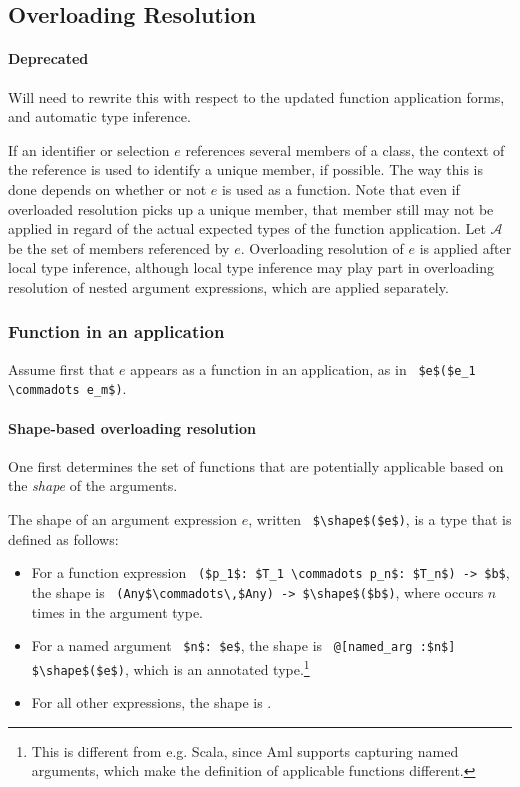\subsection{Overloading Resolution}
\label{sec:overloading-resolution}

\paragraph{Deprecated}
Will need to rewrite this with respect to the updated function application forms, and automatic type inference. 

If an identifier or selection $e$ references several members of a class, the context of the reference is used to identify a unique member, if possible. The way this is done depends on whether or not $e$ is used as a function. Note that even if overloaded resolution picks up a unique member, that member still may not be applied in regard of the actual expected types of the function application. Let $\mathcal{A}$ be the set of members referenced by $e$. Overloading resolution of $e$ is applied after local type inference, although local type inference may play part in overloading resolution of nested argument expressions, which are applied separately. 

\subsubsection{Function in an application}

Assume first that $e$ appears as a function in an application, as in ~\lstinline!$e$($e_1 \commadots e_m$)!.

\paragraph{Shape-based overloading resolution}
One first determines the set of functions that are potentially applicable based on the {\em shape} of the arguments. 

The shape of an argument expression $e$, written ~\lstinline!$\shape$($e$)!, is a type that is defined as follows:
\begin{itemize}
\item For a function expression ~\lstinline!($p_1$: $T_1 \commadots p_n$: $T_n$) -> $b$!, the shape is ~\lstinline!(Any$\commadots\,$Any) -> $\shape$($b$)!, where  occurs $n$ times in the argument type. 
\item For a named argument ~\lstinline!$n$: $e$!, the shape is ~\lstinline!@[named_arg :$n$] $\shape$($e$)!, which is an annotated type.\footnote{This is different from e.g. Scala, since Aml supports capturing named arguments, which make the definition of applicable functions different.} %
\item For all other expressions, the shape is . 
\end{itemize}

